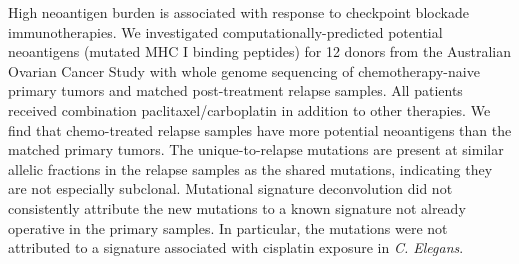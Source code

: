 High neoantigen burden is associated with response to checkpoint blockade immunotherapies. We investigated computationally-predicted potential neoantigens (mutated MHC I binding peptides) for 12 donors from the Australian Ovarian Cancer Study with whole genome sequencing of chemotherapy-naive primary tumors and matched post-treatment relapse samples. All patients received combination paclitaxel/carboplatin in addition to other therapies. We find that chemo-treated relapse samples have more potential neoantigens than the matched primary tumors. The unique-to-relapse mutations are present at similar allelic fractions in the relapse samples as the shared mutations, indicating they are not especially subclonal. Mutational signature deconvolution did not consistently attribute the new mutations to a known signature not already operative in the primary samples. In particular, the mutations were not attributed to a signature associated with cisplatin exposure in \textit{C. Elegans}.

